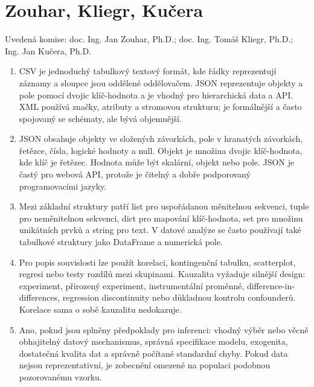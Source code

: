 \documentclass[12pt,a4paper]{article}
\begin{document}
\section{Zouhar, Kliegr, Kučera}
Uvedená komise: doc. Ing. Jan Zouhar, Ph.D.; doc. Ing. Tomáš Kliegr, Ph.D.; Ing. Jan Kučera, Ph.D.

\begin{enumerate}
  \item {}

  CSV je jednoduchý tabulkový textový formát, kde řádky reprezentují záznamy a sloupce jsou oddělené
  oddělovačem. JSON reprezentuje objekty a pole pomocí dvojic klíč-hodnota a je vhodný pro hierarchická
  data a API. XML používá značky, atributy a stromovou strukturu; je formálnější a často spojovaný se
  schématy, ale bývá objemnější.

  \item {}

  JSON obsahuje objekty ve složených závorkách, pole v hranatých závorkách, řetězce, čísla, logické
  hodnoty a null. Objekt je množina dvojic klíč-hodnota, kde klíč je řetězec.
  Hodnota může být skalární, objekt nebo pole. JSON je častý pro webová API, protože je čitelný a
  dobře podporovaný programovacími jazyky.

  \item {}

  Mezi základní struktury patří list pro uspořádanou měnitelnou sekvenci, tuple pro neměnitelnou
  sekvenci, dict pro mapování klíč-hodnota, set pro množinu unikátních prvků a string pro text.
  V datové analýze se často používají také tabulkové struktury jako DataFrame a numerická pole.

  \item {}

  Pro popis souvislosti lze použít korelaci, kontingenční tabulku, scatterplot, regresi nebo testy
  rozdílů mezi skupinami. Kauzalita vyžaduje silnější design: experiment, přirozený experiment,
  instrumentální proměnné, difference-in-differences, regression discontinuity nebo důkladnou kontrolu
  confounderů. Korelace sama o sobě kauzalitu nedokazuje.

  \item {}

  Ano, pokud jsou splněny předpoklady pro inferenci: vhodný výběr nebo věcně obhajitelný datový
  mechanismus, správná specifikace modelu, exogenita, dostatečná kvalita dat a správně počítané
  standardní chyby. Pokud data nejsou reprezentativní, je zobecnění omezené na populaci podobnou
  pozorovanému vzorku.


\end{enumerate}
\end{document}

